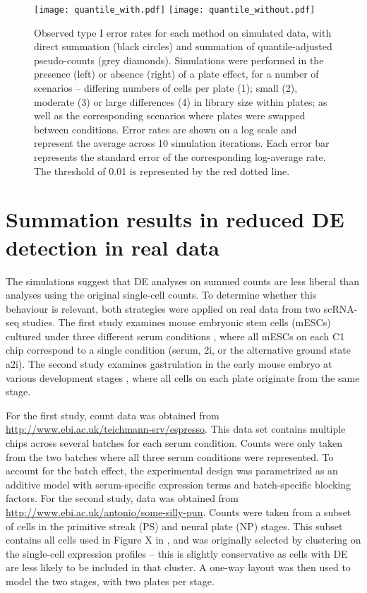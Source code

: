 \documentclass{article}
\begin{document}
\begin{figure}[tbp]
\begin{center}
\texttt{[image: quantile\_with.pdf]}
\texttt{[image: quantile\_without.pdf]}
\end{center}
\caption{
    Observed type I error rates for each method on simulated data, with direct summation (black circles) and summation of quantile-adjusted pseudo-counts (grey diamonds). 
    Simulations were performed in the presence (left) or absence (right) of a plate effect, for a number of scenarios
        -- differing numbers of cells per plate (1);
        small (2), moderate (3) or large differences (4) in library size within plates;
        as well as the corresponding scenarios where plates were swapped between conditions.
    Error rates are shown on a log scale and represent the average across 10 simulation iterations.
    Each error bar represents the standard error of the corresponding log-average rate.
    The threshold of 0.01 is represented by the red dotted line.
}
\label{fig:complexplate}
\end{figure}

\section{Summation results in reduced DE detection in real data}
The simulations suggest that DE analyses on summed counts are less liberal than analyses using the original single-cell counts.
To determine whether this behaviour is relevant, both strategies were applied on real data from two scRNA-seq studies.
The first study examines mouse embryonic stem cells (mESCs) cultured under three different serum conditions \cite{kolod2015single},
    where all mESCs on each C1 chip correspond to a single condition (serum, 2i, or the alternative ground state a2i).
The second study examines gastrulation in the early mouse embryo at various development stages \cite{scialdone2015single},
    where all cells on each plate originate from the same stage.

For the first study, count data was obtained from \url{http://www.ebi.ac.uk/teichmann-srv/espresso}. 
This data set contains multiple chips across several batches for each serum condition.
Counts were only taken from the two batches where all three serum conditions were represented.
To account for the batch effect, the experimental design was parametrized as an additive model with serum-specific expression terms and batch-specific blocking factors.
For the second study, data was obtained from \url{http://www.ebi.ac.uk/antonio/some-silly-pun}.
Counts were taken from a subset of cells in the primitive streak (PS) and neural plate (NP) stages.
This subset contains all cells used in Figure X in \cite{scialdone2015single}, and was originally selected by clustering on the single-cell expression profiles 
    -- this is slightly conservative as cells with DE are less likely to be included in that cluster.
A one-way layout was then used to model the two stages, with two plates per stage.
\end{document}
